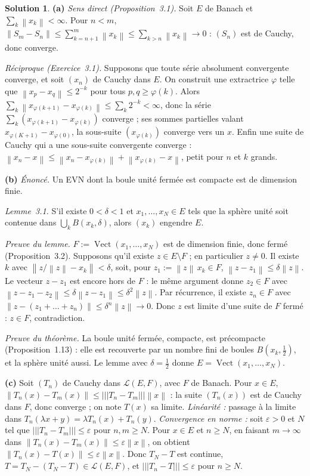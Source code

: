 \documentclass[11pt,a4paper]{article}
\newcommand{\Vect}{\operatorname{Vect}}
\newcommand{\norm}[1]{\left\|#1\right\|}
\newcommand{\opnorm}[1]{|\!|\!|#1|\!|\!|}
\newcommand{\Lc}{\mathcal{L}}
\theoremstyle{definition}
\newtheorem*{solution}{Solution}
\begin{document}
\begin{solution}
\noindent\textbf{(a)} \emph{Sens direct (Proposition~3.1).} Soit $E$ de Banach et $\sum_k\norm{x_k}<\infty$. Pour $n<m$, $\norm{S_m-S_n}\le\sum_{k=n+1}^m\norm{x_k}\le\sum_{k>n}\norm{x_k}\to0$ : $(S_n)$ est de Cauchy, donc converge.

\emph{Réciproque (Exercice~3.1).} Supposons que toute série absolument convergente converge, et soit $(x_n)$ de Cauchy dans $E$. On construit une extractrice $\varphi$ telle que $\norm{x_p-x_q}\le2^{-k}$ pour tous $p,q\ge\varphi(k)$. Alors $\sum_k\norm{x_{\varphi(k+1)}-x_{\varphi(k)}}\le\sum_k2^{-k}<\infty$, donc la série $\sum_k(x_{\varphi(k+1)}-x_{\varphi(k)})$ converge ; ses sommes partielles valant $x_{\varphi(K+1)}-x_{\varphi(0)}$, la sous-suite $(x_{\varphi(k)})$ converge vers un $x$. Enfin une suite de Cauchy qui a une sous-suite convergente converge : $\norm{x_n-x}\le\norm{x_n-x_{\varphi(k)}}+\norm{x_{\varphi(k)}-x}$, petit pour $n$ et $k$ grands.

\medskip
\noindent\textbf{(b)} \emph{Énoncé.} Un EVN dont la boule unité fermée est compacte est de dimension finie.

\emph{Lemme~3.1.} S'il existe $0<\delta<1$ et $x_1,\dots,x_N\in E$ tels que la sphère unité soit contenue dans $\bigcup_kB(x_k,\delta)$, alors $(x_k)$ engendre $E$.

\emph{Preuve du lemme.} $F:=\Vect(x_1,\dots,x_N)$ est de dimension finie, donc fermé (Proposition~3.2). Supposons qu'il existe $z\in E\setminus F$ ; en particulier $z\ne0$. Il existe $k$ avec $\norm{z/\norm z-x_k}<\delta$, soit, pour $z_1:=\norm z\,x_k\in F$, $\norm{z-z_1}\le\delta\norm z$. Le vecteur $z-z_1$ est encore hors de $F$ : le même argument donne $z_2\in F$ avec $\norm{z-z_1-z_2}\le\delta\norm{z-z_1}\le\delta^2\norm z$. Par récurrence, il existe $z_n\in F$ avec $\norm{z-(z_1+\dots+z_n)}\le\delta^n\norm z\to0$. Donc $z$ est limite d'une suite de $F$ fermé : $z\in F$, contradiction.

\emph{Preuve du théorème.} La boule unité fermée, compacte, est précompacte (Proposition~1.13) : elle est recouverte par un nombre fini de boules $B(x_k,\frac12)$, et la sphère unité aussi. Le lemme avec $\delta=\frac12$ donne $E=\Vect(x_1,\dots,x_N)$.

\medskip
\noindent\textbf{(c)} Soit $(T_n)$ de Cauchy dans $\Lc(E,F)$, avec $F$ de Banach. Pour $x\in E$, $\norm{T_n(x)-T_m(x)}\le\opnorm{T_n-T_m}\norm x$ : la suite $(T_n(x))$ est de Cauchy dans $F$, donc converge ; on note $T(x)$ sa limite. \emph{Linéarité :} passage à la limite dans $T_n(\lambda x+y)=\lambda T_n(x)+T_n(y)$. \emph{Convergence en norme :} soit $\varepsilon>0$ et $N$ tel que $\opnorm{T_n-T_m}\le\varepsilon$ pour $n,m\ge N$. Pour $x\in E$ et $n\ge N$, en faisant $m\to\infty$ dans $\norm{T_n(x)-T_m(x)}\le\varepsilon\norm x$, on obtient $\norm{T_n(x)-T(x)}\le\varepsilon\norm x$. Donc $T_N-T$ est continue, $T=T_N-(T_N-T)\in\Lc(E,F)$, et $\opnorm{T_n-T}\le\varepsilon$ pour $n\ge N$.


\end{solution}
\end{document}
